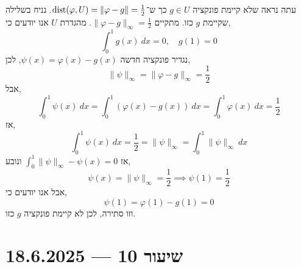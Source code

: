 \begin{example}
	עתה נראה שלא קיימת פונקציה $g \in U$ כך ש־$\operatorname{dist}(\varphi, U) = \lVert \varphi - g \rVert = \frac{1}{2}$.
	נניח בשלילה שקיימת $g$ כזו.
	מתקיים $\lVert \varphi - g \rVert_\infty = \frac{1}{2}$.
	מהגדרת $U$ אנו יודעים כי,
	\[
		\int_{0}^{1} g(x)\ dx = 0,
		\quad
		g(1) = 0
	\]
	נגדיר פונקציה חדשה $\psi(x) = \varphi(x) - g(x)$, לכן,
	\[
		\lVert \psi \rVert_\infty
		= \lVert \varphi - g \rVert_\infty
		= \frac{1}{2}
	\]
	אבל,
	\[
		\int_{0}^{1} \psi(x)\ dx
		= \int_{0}^{1} (\varphi(x) - g(x))\ dx
		= \int_{0}^{1} \varphi(x)\ dx
		= \frac{1}{2}
	\]
	אז,
	\[
		\int_{0}^{1} \psi(x)\ dx
		= \frac{1}{2}
		= \lVert \psi \rVert_\infty
		= \int_{0}^{1} \lVert \psi \rVert_\infty\ dx
	\]
	אז $\int_{0}^{1} \lVert \psi \rVert_\infty - \psi(x) = 0$ ונובע,
	\[
		\psi(x)
		= \lVert \psi \rVert_\infty
		= \frac{1}{2}
		\implies \psi(1) = \frac{1}{2}
	\]
	אבל אנו יודעים כי,
	\[
		\psi(1)
		= \varphi(1) - g(1)
		= 0
	\]
	וזו סתירה,
	לכן לא קיימת פונקציה $g$ כזו.
\end{example}

\section{שיעור 10 --- 18.6.2025}
